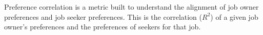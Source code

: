 Preference correlation is a metric built to understand the alignment of job owner preferences and job seeker preferences. This is the correlation ($R^2$) of a given job owner's preferences and the preferences of seekers for that job. 